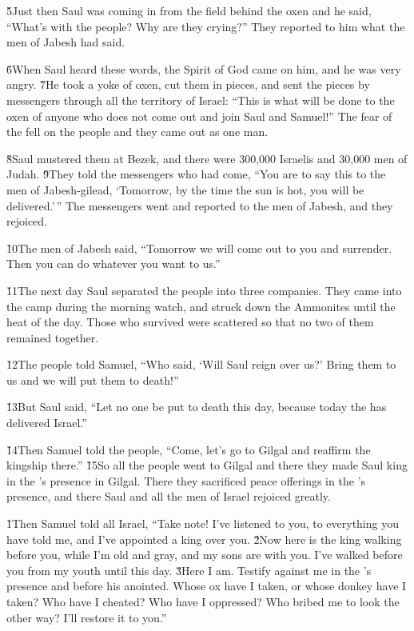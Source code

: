\v{5}Just then Saul was coming in from the field behind the oxen and he said, ``What's with the people? Why are they crying?'' They reported to him what the men of Jabesh had said.

\v{6}When Saul heard these words, the Spirit of God came on him, and he was very angry. \v{7}He took a yoke of oxen, cut them in pieces, and sent the pieces by messengers through all the territory of Israel: ``This is what will be done to the oxen of anyone who does not come out and join Saul and Samuel!'' The fear of the  fell on the people and they came out as one man.

\v{8}Saul mustered them at Bezek, and there were 300,000 Israelis and 30,000 men of Judah. \v{9}They told the messengers who had come, ``You are to say this to the men of Jabesh-gilead, `Tomorrow, by the time the sun is hot, you will be delivered.'\,'' The messengers went and reported to the men of Jabesh, and they rejoiced.

\v{10}The men of Jabesh said, ``Tomorrow we will come out to you and surrender. Then you can do whatever you want to us.''

\v{11}The next day Saul separated the people into three companies. They came into the camp during the morning watch, and struck down the Ammonites until the heat of the day. Those who survived were scattered so that no two of them remained together.

\v{12}The people told Samuel, ``Who said, `Will Saul reign over us?' Bring them to us and we will put them to death!''

\v{13}But Saul said, ``Let no one be put to death this day, because today the  has delivered Israel.''

\v{14}Then Samuel told the people, ``Come, let's go to Gilgal and reaffirm the kingship there.'' \v{15}So all the people went to Gilgal and there they made Saul king in the 's presence in Gilgal. There they sacrificed peace offerings in the 's presence, and there Saul and all the men of Israel rejoiced greatly.

\v{1}Then Samuel told all Israel, ``Take note! I've listened to you, to everything you have told me, and I've appointed a king over you. \v{2}Now here is the king walking before you, while I'm old and gray, and my sons are with you. I've walked before you from my youth until this day. \v{3}Here I am. Testify against me in the 's presence and before his anointed. Whose ox have I taken, or whose donkey have I taken? Who have I cheated? Who have I oppressed? Who bribed me to look the other way? I'll restore it to you.''

